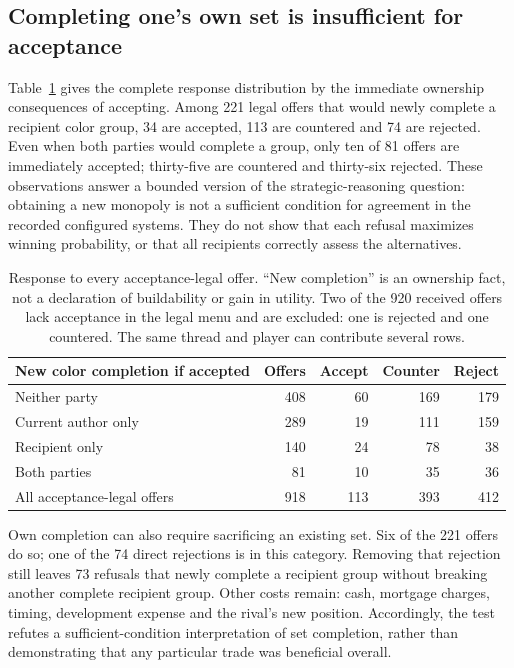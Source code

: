 \subsection{Completing one's own set is insufficient for acceptance}
\label{sec:agenda-completion-response}

Table~\ref{tab:agenda-completion} gives the complete response distribution by
the immediate ownership consequences of accepting. Among 221 legal offers that
would newly complete a recipient color group, 34 are accepted, 113 are countered
and 74 are rejected. Even when both parties would complete a group, only ten
of 81 offers are immediately accepted; thirty-five are countered and thirty-six
rejected. These observations answer a bounded version of the strategic-reasoning
question: obtaining a new monopoly is not a sufficient condition for agreement
in the recorded configured systems. They do not show that each refusal maximizes
winning probability, or that all recipients correctly assess the alternatives.

\begin{table}[t]
\centering\small
\begin{tabular}{lrrrr}
\toprule
New color completion if accepted & Offers & Accept & Counter & Reject\\
\midrule
Neither party & 408 & 60 & 169 & 179\\
Current author only & 289 & 19 & 111 & 159\\
Recipient only & 140 & 24 & 78 & 38\\
Both parties & 81 & 10 & 35 & 36\\
\midrule
All acceptance-legal offers & 918 & 113 & 393 & 412\\
\bottomrule
\end{tabular}
\caption{Response to every acceptance-legal offer. ``New completion'' is an
ownership fact, not a declaration of buildability or gain in utility. Two of
the 920 received offers lack acceptance in the legal menu and are excluded:
one is rejected and one countered. The same thread and player can contribute
several rows.}
\label{tab:agenda-completion}
\end{table}

Own completion can also require sacrificing an existing set. Six of the 221
offers do so; one of the 74 direct rejections is in this category. Removing
that rejection still leaves 73 refusals that newly complete a recipient group
without breaking another complete recipient group. Other costs remain:
cash, mortgage charges, timing, development expense and the rival's new
position. Accordingly, the test refutes a sufficient-condition interpretation
of set completion, rather than demonstrating that any particular trade was
beneficial overall.

